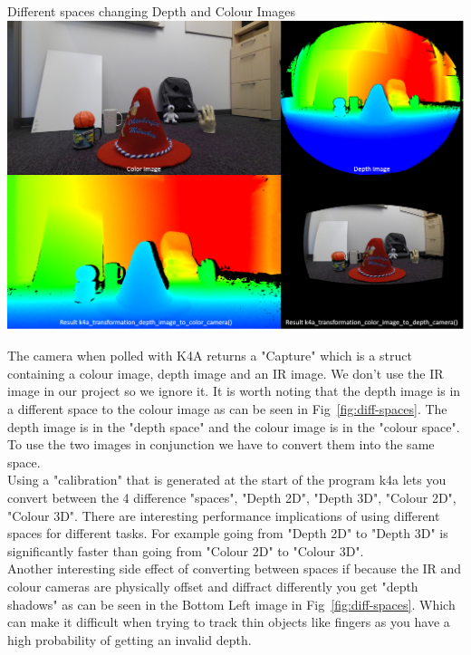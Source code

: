 \begin{figureBox}[label={fig:diff-spaces}, width=0.8\linewidth]{Different spaces changing Depth and Colour Images}
    \includegraphics[width = 1.0\linewidth]{./implementation/figures/different spaces.png}
\end{figureBox}


The camera when polled with K4A returns a "Capture" which is a struct containing a colour image, depth image and an IR image. We don't use the IR image in our project so we ignore it. It is worth noting that the depth image is in a different space to the colour image as can be seen in Fig~\ref{fig:diff-spaces}. The depth image is in the "depth space" and the colour image is in the "colour space". To use the two images in conjunction we have to convert them into the same space. \\

Using a "calibration" that is generated at the start of the program k4a lets you convert between the 4 difference "spaces", "Depth 2D", "Depth 3D", "Colour 2D", "Colour 3D". There are interesting performance implications of using different spaces for different tasks. For example going from "Depth 2D" to "Depth 3D" is significantly faster than going from "Colour 2D" to "Colour 3D". \\

Another interesting side effect of converting between spaces if because the IR and colour cameras are physically offset and diffract differently you get "depth shadows" \tocite as can be seen in the Bottom Left image in Fig~\ref{fig:diff-spaces}. Which can make it difficult when trying to track thin objects like fingers as you have a high probability of getting an invalid depth.

